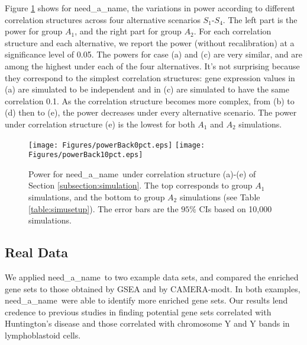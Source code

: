 \documentclass[useAMS,usenatbib, galley]{biom}
\newcommand{\OurMethod}{need\_a\_name}
\newcommand{\aaCase}{a}
\newcommand{\aCase}{b}
\newcommand{\cCase}{c}
\newcommand{\eCase}{d}
\newcommand{\fCase}{e}
\newcommand{\CMT}{CAMERA-modt}
\begin{document}
	
	
	Figure \ref{fig:power} shows for \OurMethod, the variations in power according to different correlation structures across four alternative scenarios $S_1$-$S_4$. The left part is the power for group $A_1$, and the right part for group $A_2$. For each correlation structure and each alternative, we report the power (without recalibration) at a significance level of 0.05. The powers for case (\aaCase) and (\cCase) are very similar, and are among the highest under each of the four alternatives. It's not surprising because they correspond to the simplest correlation structures: gene expression values in (\aaCase) are simulated to be independent and in (\cCase) are simulated to have the same correlation 0.1. As the correlation structure becomes more complex, from (\aCase) to (\eCase) then to (\fCase), the power decreases under every alternative scenario. The power under correlation structure (\fCase) is the lowest for both $A_1$ and $A_2$ simulations.%
	
	\begin{figure}
		\begin{center}
			\texttt{[image: Figures/powerBack0pct.eps]}
			\texttt{[image: Figures/powerBack10pct.eps]}
		\end{center} 
			\caption{Power for \OurMethod~under correlation structure (\aaCase)-(\fCase) of Section \ref{subsection:simulation}. The top corresponds to group $A_1$ simulations, and the bottom to group $A_2$ simulations (see Table \ref{table:simusetup}). The error bars are the $95\%$ CIs based on 10,000 simulations. }\label{fig:power}
	\end{figure} 
	
	\subsection{Real Data}
	We applied \OurMethod~to two example data sets, and compared the enriched gene sets to those obtained by GSEA and by \CMT. In both examples, \OurMethod~were able to identify more enriched gene sets. Our results lend credence to previous studies in finding potential gene sets correlated with Huntington's disease and those correlated with chromosome Y and Y bands in lymphoblastoid cells.  
	
\end{document}
